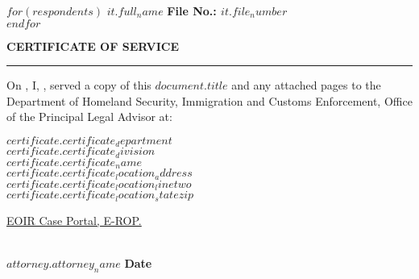 \documentclass[12pt]{article}
\date{}
\begin{document}
$for(respondents)$
\noindent\textbf{\large $it.full_name$} \hfill \textbf{File No.: $it.file_number$} \\
$endfor$

\vspace{2em}

\begin{center}
    {\Large \textbf{CERTIFICATE OF SERVICE}}\\
    \rule{0.65\textwidth}{0.6pt} %
\end{center}

\vspace{2em}

\justifying
\noindent On \uline{\hspace{3cm}}, I, \uline{\hspace{10cm}}, served a copy of this \uline{$document.title$} and any attached pages to the Department of Homeland Security, Immigration and Customs Enforcement, Office of the Principal Legal Advisor at:

\vspace{1em}

\begin{flushleft}  
  \hspace{2em} \uline{$certificate.certificate_department$}\\
  \hspace{2em} \uline{$certificate.certificate_division$}\\
  \hspace{2em} \uline{$certificate.certificate_name$}\\
  \hspace{2em} \uline{$certificate.certificate_location_address$}\\
  \hspace{2em} \uline{$certificate.certificate_location_linetwo$}\\
  \hspace{2em} \uline{$certificate.certificate_location_statezip$}
\end{flushleft}

\vspace{2em}

\noindent {} \underline{EOIR Case Portal, E-ROP.}

\vspace{4em}

\noindent\makebox[0.45\textwidth]{\hrulefill} \hfill \makebox[0.45\textwidth]{\hrulefill}\\
\noindent\textbf{$attorney.attorney_name$} \hfill \textbf{Date}
\end{document}
